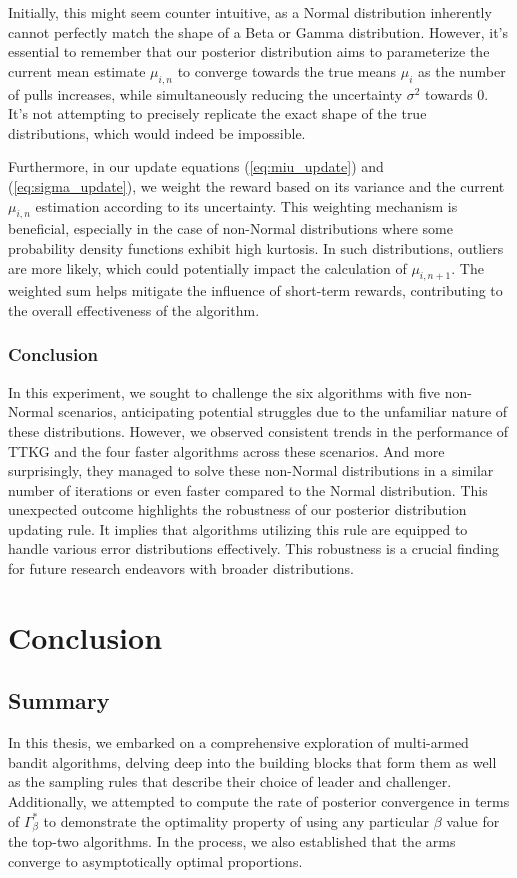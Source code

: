 \documentclass[a4paper, 12pt]{article}
\theoremstyle{definition}
\begin{document}
Initially, this might seem counter intuitive, as a Normal distribution inherently cannot perfectly match the shape of a Beta or Gamma distribution. However, it's essential to remember that our posterior distribution aims to parameterize the current mean estimate $\mu_{i,n}$ to converge towards the true means $\mu_i$ as the number of pulls increases, while simultaneously reducing the uncertainty $\sigma^2$ towards 0. It's not attempting to precisely replicate the exact shape of the true distributions, which would indeed be impossible.

Furthermore, in our update equations (\ref{eq:miu_update}) and (\ref{eq:sigma_update}), we weight the reward based on its variance and the current $\mu_{i,n}$ estimation according to its uncertainty. This weighting mechanism is beneficial, especially in the case of non-Normal distributions where some probability density functions exhibit high kurtosis. In such distributions, outliers are more likely, which could potentially impact the calculation of $\mu_{i,n+1}$. The weighted sum helps mitigate the influence of short-term rewards, contributing to the overall effectiveness of the algorithm.

\subsubsection{Conclusion}
In this experiment, we sought to challenge the six algorithms with five non-Normal scenarios, anticipating potential struggles due to the unfamiliar nature of these distributions. However, we observed consistent trends in the performance of TTKG and the four faster algorithms across these scenarios. And more surprisingly, they managed to solve these non-Normal distributions in a similar number of iterations or even faster compared to the Normal distribution. This unexpected outcome highlights the robustness of our posterior distribution updating rule. It implies that algorithms utilizing this rule are equipped to handle various error distributions effectively. This robustness is a crucial finding for future research endeavors with broader distributions.



\section{Conclusion}
\subsection{Summary}
In this thesis, we embarked on a comprehensive exploration of multi-armed bandit algorithms, delving deep into the building blocks that form them as well as the sampling rules that describe their choice of leader and challenger. Additionally, we attempted to compute the rate of posterior convergence in terms of $\Gamma_\beta^*$ to demonstrate the optimality property of using any particular $\beta$ value for the top-two algorithms. In the process, we also established that the arms converge to asymptotically optimal proportions.
\end{document}
